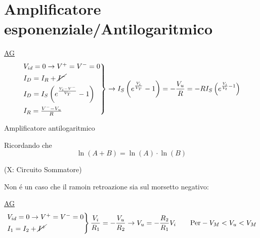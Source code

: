 \documentclass{article}
\begin{document}
\section{Amplificatore esponenziale/Antilogaritmico}
\underline{AG}
\[
    \begin{rcases}
        V_{id} = 0 \rightarrow V^+ = V^- = 0\\
        I_D = I_R + \cancel{I^-}\\
        I_D = I_S \left(e^{\frac{V_i - V^-}{V_T}} -1 \right)\\
        I_R = \frac{V^- - V_u}{R}
    \end{rcases} \rightarrow
    I_S \left(e^{\frac{V_i}{V_T}}-1\right) = -\frac{V_u}{R} = -RI_S \left( e^{\frac{V_i}{V_t} -1}\right)
\]

Amplificatore antilogaritmico

Ricordando che
\[ \ln (A+B) = \ln(A) \cdot \ln(B) \]

(X: Circuito Sommatore)

Non \'e un caso che il ramoin retroazione sia sul morsetto negativo:

\begin{minipage}{0.45\textwidth}
\end{minipage}
\begin{minipage}{0.5\textwidth}
\end{minipage}

\underline{AG}
\[
    \begin{rcases}
        V_{id} = 0 \rightarrow V^+ = V^- = 0 \\
        I_1 = I_2 + \cancel{I^+}\\
    \end{rcases} \frac{V_i}{R_1} = -\frac{V_u}{R_2} \rightarrow V_u = -\frac{R_2}{R_1}V_i \qquad \text{Per} -V_M < V_u < V_M
\]
\end{document}
